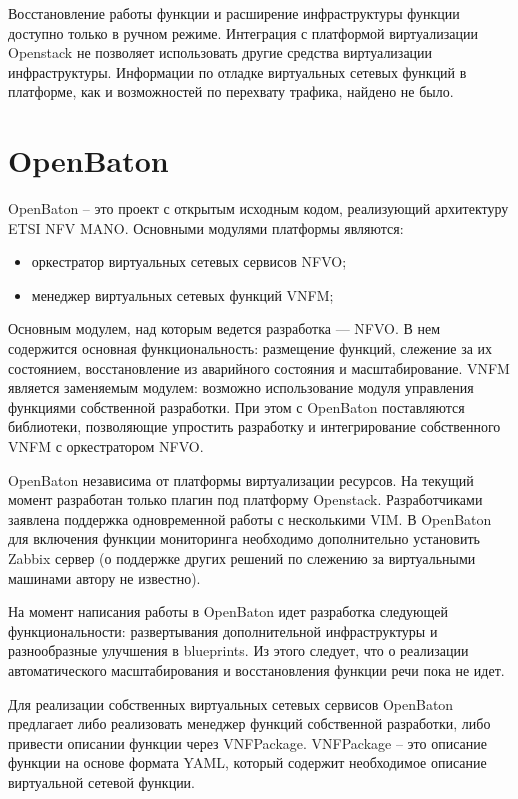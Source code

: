 \documentclass[oneside,final,14pt,a4paper]{extreport}
\begin{document}
Восстановление работы функции и расширение инфраструктуры функции доступно только в ручном режиме. Интеграция с платформой виртуализации Openstack не позволяет использовать другие средства виртуализации инфраструктуры. Информации по отладке виртуальных сетевых функций в платформе, как и возможностей по перехвату трафика, найдено не было.


\section{OpenBaton}
OpenBaton -- это проект с открытым исходным кодом, реализующий архитектуру ETSI NFV MANO. Основными модулями платформы являются:
\begin{itemize}
	\item оркестратор виртуальных сетевых сервисов NFVO;
	\item менеджер виртуальных сетевых функций VNFM;
\end{itemize}

Основным модулем, над которым ведется разработка --- NFVO. В нем содержится основная функциональность: размещение функций, слежение за их состоянием, восстановление из аварийного состояния и масштабирование. VNFM является заменяемым модулем: возможно использование модуля управления функциями собственной разработки. При этом с OpenBaton поставляются библиотеки, позволяющие упростить разработку и интегрирование собственного VNFM с оркестратором NFVO.

OpenBaton независима от платформы виртуализации ресурсов. На текущий момент разработан только плагин под платформу Openstack. Разработчиками заявлена поддержка одновременной работы с несколькими VIM. В OpenBaton для включения функции мониторинга необходимо дополнительно установить Zabbix сервер (о поддержке других решений по слежению за виртуальными машинами автору не известно).

На момент написания работы в OpenBaton идет разработка следующей функциональности: развертывания дополнительной инфраструктуры и разнообразные улучшения в blueprints. Из этого следует, что о реализации автоматического масштабирования и восстановления функции речи пока не идет.

Для реализации собственных виртуальных сетевых сервисов OpenBaton предлагает либо реализовать менеджер функций собственной разработки, либо привести описании функции через VNFPackage. VNFPackage -- это описание функции на основе формата YAML, который содержит необходимое описание виртуальной сетевой функции.\cite{bib:openbaton-official}
\end{document}
